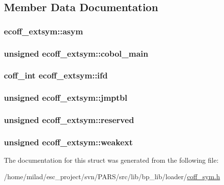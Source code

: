 \subsection{Member Data Documentation}
\hypertarget{structecoff__extsym_a87f587c09c222ba0922c7ee88c1a6b8b}{
\subsubsection[{asym}]{ {\bf ecoff\_\-extsym::asym}}}
\label{structecoff__extsym_a87f587c09c222ba0922c7ee88c1a6b8b}
\hypertarget{structecoff__extsym_acbb40b2a7a64c4d3b141277f8cd7f735}{
\subsubsection[{cobol\_\-main}]{\setlength{\rightskip}{0pt plus 5cm}unsigned {\bf ecoff\_\-extsym::cobol\_\-main}}}
\label{structecoff__extsym_acbb40b2a7a64c4d3b141277f8cd7f735}
\hypertarget{structecoff__extsym_add003edd8dbbaa77df9d6632e7cbefab}{
\subsubsection[{ifd}]{\setlength{\rightskip}{0pt plus 5cm}coff\_\-int {\bf ecoff\_\-extsym::ifd}}}
\label{structecoff__extsym_add003edd8dbbaa77df9d6632e7cbefab}
\hypertarget{structecoff__extsym_a803653253624913be2a4593db1429fb1}{
\subsubsection[{jmptbl}]{\setlength{\rightskip}{0pt plus 5cm}unsigned {\bf ecoff\_\-extsym::jmptbl}}}
\label{structecoff__extsym_a803653253624913be2a4593db1429fb1}
\hypertarget{structecoff__extsym_a190ce15962a8ce49490bbddc1574d11e}{
\subsubsection[{reserved}]{\setlength{\rightskip}{0pt plus 5cm}unsigned {\bf ecoff\_\-extsym::reserved}}}
\label{structecoff__extsym_a190ce15962a8ce49490bbddc1574d11e}
\hypertarget{structecoff__extsym_afc5d5b07df88423a1f2c1d11ad5b4caa}{
\subsubsection[{weakext}]{\setlength{\rightskip}{0pt plus 5cm}unsigned {\bf ecoff\_\-extsym::weakext}}}
\label{structecoff__extsym_afc5d5b07df88423a1f2c1d11ad5b4caa}


The documentation for this struct was generated from the following file:\begin{DoxyCompactItemize}
\item 
/home/milad/esc\_\-project/svn/PARS/src/lib/bp\_\-lib/loader/\hyperlink{coff__sym_8h}{coff\_\-sym.h}\end{DoxyCompactItemize}
